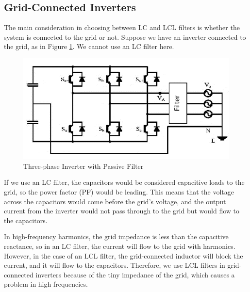 \documentclass[12pt,a4paper]{book}
\begin{document}
\subsection{Grid-Connected Inverters}
The main consideration in choosing between LC and LCL filters is whether the system is connected to the grid or not. Suppose we have an inverter connected to the grid, as in Figure \ref{fig:image19}. We cannot use an LC filter here.

\begin{figure}[h]
  \centering
  \includegraphics[width=15cm]{image19.png}
  \caption{Three-phase Inverter with Passive Filter}
  \label{fig:image19}
\end{figure}

If we use an LC filter, the capacitors would be considered capacitive loads to the grid, so the power factor (PF) would be leading. This means that the voltage across the capacitors would come before the grid's voltage, and the output current from the inverter would not pass through to the grid but would flow to the capacitors.

In high-frequency harmonics, the grid impedance is less than the capacitive reactance, so in an LC filter, the current will flow to the grid with harmonics. However, in the case of an LCL filter, the grid-connected inductor will block the current, and it will flow to the capacitors. Therefore, we use LCL filters in grid-connected inverters because of the tiny impedance of the grid, which causes a problem in high frequencies.
\end{document}
